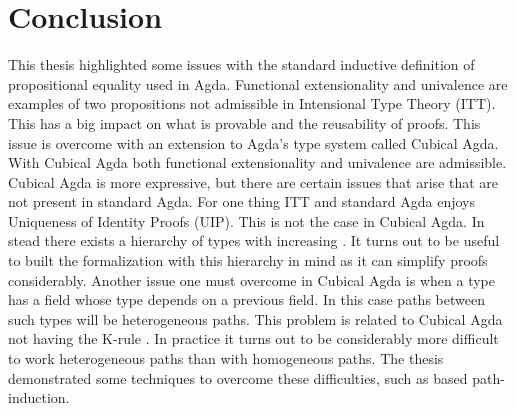 \chapter{Conclusion}
This thesis highlighted some issues with the standard inductive definition of
propositional equality used in Agda. Functional extensionality and univalence
are examples of two propositions not admissible in Intensional Type Theory
(ITT). This has a big impact on what is provable and the reusability of proofs.
This issue is overcome with an extension to Agda's type system called Cubical
Agda. With Cubical Agda both functional extensionality and univalence are
admissible. Cubical Agda is more expressive, but there are certain issues that
arise that are not present in standard Agda. For one thing ITT and standard Agda
enjoys Uniqueness of Identity Proofs (UIP). This is not the case in Cubical
Agda. In stead there exists a hierarchy of types with increasing
. It turns out to be useful to built the
formalization with this hierarchy in mind as it can simplify proofs
considerably. Another issue one must overcome in Cubical Agda is when a type has
a field whose type depends on a previous field. In this case paths between such
types will be heterogeneous paths. This problem is related to Cubical Agda not
having the K-rule . In practice it
turns out to be considerably more difficult to work heterogeneous paths than
with homogeneous paths. The thesis demonstrated some techniques to overcome
these difficulties, such as based path-induction.


